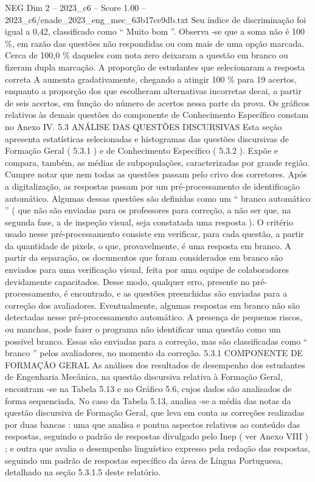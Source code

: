 \begin{textsample}{NEG Dim 2 – 2023\_c6 – Score 1.00 – 2023\_c6/enade\_2023\_eng\_mec\_63b17ce9db.txt}
Seu índice de discriminação foi igual a 0,42, classificado como “ Muito bom ”.
Observa -se que a soma não é 100 \%, em razão das questões não respondidas ou com mais de uma opção marcada.
Cerca de 100,0 \% daqueles com nota zero deixaram a questão em branco ou fizeram dupla marcação.
A proporção de estudantes que selecionaram a resposta correta A aumenta gradativamente, chegando a atingir 100 \% para 19 acertos, enquanto a proporção dos que escolheram alternativas incorretas decai, a partir de seis acertos, em função do número de acertos nessa parte da prova.
Os gráficos relativos às demais questões do componente de Conhecimento Específico constam no Anexo IV. 5.3 ANÁLISE DAS QUESTÕES DISCURSIVAS Esta seção apresenta estatísticas selecionadas e histogramas das questões discursivas de Formação Geral ( 5.3.1 ) e de Conhecimento Específico ( 5.3.2 ).
Expõe e compara, também, as médias de subpopulações, caracterizadas por grande região.
Cumpre notar que nem todas as questões passam pelo crivo dos corretores.
Após a digitalização, as respostas passam por um pré-processamento de identificação automático.
Algumas dessas questões são definidas como um “ branco automático ” ( que não são enviadas para os professores para correção, a não ser que, na segunda fase, a de inspeção visual, seja constatada uma resposta ).
O critério usado nesse pré-processamento consiste em verificar, para cada questão, a partir da quantidade de pixels, o que, provavelmente, é uma resposta em branco.
A partir da separação, os documentos que foram considerados em branco são enviados para uma verificação visual, feita por uma equipe de colaboradores devidamente capacitados.
Desse modo, qualquer erro, presente no pré-processamento, é encontrado, e as questões preenchidas são enviadas para a correção dos avaliadores.
Eventualmente, algumas respostas em branco não são detectadas nesse pré-processamento automático.
A presença de pequenos riscos, ou manchas, pode fazer o programa não identificar uma questão como um possível branco.
Essas são enviadas para a correção, mas são classificadas como “ branco ” pelos avaliadores, no momento da correção. 5.3.1 COMPONENTE DE FORMAÇÃO GERAL As análises dos resultados de desempenho dos estudantes de Engenharia Mecânica, na questão discursiva relativa à Formação Geral, encontram -se na Tabela 5.13 e no Gráfico 5.6, cujos dados são analisados de forma sequenciada.
No caso da Tabela 5.13, analisa -se a média das notas da questão discursiva de Formação Geral, que leva em conta as correções realizadas por duas bancas : uma que analisa e pontua aspectos relativos ao conteúdo das respostas, seguindo o padrão de respostas divulgado pelo Inep ( ver Anexo VIII ) ; e outra que avalia o desempenho linguístico expresso pela redação das respostas, seguindo um padrão de respostas específico da área de Língua Portuguesa, detalhado na seção 5.3.1.5 deste relatório.

\end{textsample}
